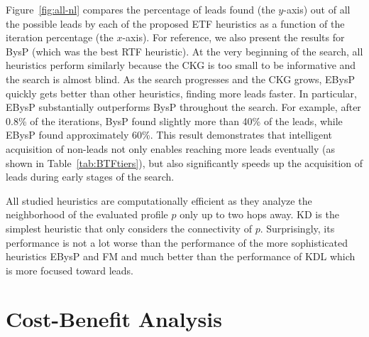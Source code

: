 \documentclass[journal]{IEEEtran}
\newcommand{\islead}[1]{{\em IsLead(#1)}}
\begin{document}


Figure~\ref{fig:all-nl} compares the percentage of leads found (the $y$-axis) out of all the possible leads by each of the proposed ETF heuristics as a function of the iteration percentage (the $x$-axis).
 For reference, we also present the results for BysP (which was the best RTF heuristic).
At the very beginning of the search, all heuristics perform similarly because the CKG
is too small to be informative and the search is almost blind. As the search
progresses and the CKG grows, EBysP quickly gets better than other  heuristics,
finding more leads faster. In particular, EBysP substantially outperforms BysP throughout the search. 
For example, after  0.8\% of the iterations, BysP found slightly more than 40\% of the leads, while EBysP
found approximately 60\%. This result demonstrates that intelligent acquisition
of non-leads not only enables reaching more leads eventually (as shown in
Table~\ref{tab:BTFtiers}), but also significantly speeds up the acquisition of
leads during  early stages of the search.


All studied heuristics are computationally efficient as they analyze the
neighborhood of the evaluated profile $p$ only up to two hops away. KD is the
simplest heuristic that only considers the connectivity of $p$. Surprisingly,
its performance is not a lot worse than the performance of the more sophisticated
heuristics EBysP and FM and much better than the performance of KDL which is
more focused toward leads.




\section{Cost-Benefit Analysis}
\label{sec:costbenefit}
\end{document}
